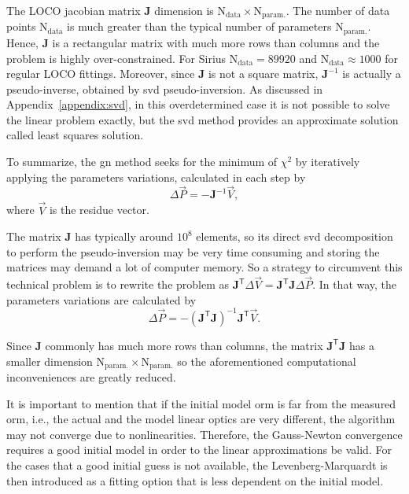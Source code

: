 The LOCO jacobian matrix $\mathbf{J}$ dimension is $\mathrm{N}_{\mathrm{data}} \times \mathrm{N}_{\mathrm{param.}}$. The number of data points $\mathrm{N}_{\mathrm{data}}$ is much greater than the typical number of parameters $\mathrm{N}_{\mathrm{param.}}$. Hence, $\mathbf{J}$ is a rectangular matrix with much more rows than columns and the problem is highly over-constrained. For Sirius $\mathrm{N}_{\mathrm{data}} = 89920$ and $\mathrm{N}_{\mathrm{data}} \approx 1000$ for regular LOCO fittings. Moreover, since $\mathbf{J}$ is not a square matrix, $\mathbf{J}^{-1}$ is actually a pseudo-inverse, obtained by \gls{svd} pseudo-inversion. As discussed in Appendix~\ref{appendix:svd}, in this overdetermined case it is not possible to solve the linear problem exactly, but the \gls{svd} method provides an approximate solution called least squares solution.

To summarize, the \gls{gn} method seeks for the minimum of $\chi^2$ by iteratively applying the parameters variations, calculated in each step by
\begin{equation}
    \Delta \vec{P} = - \mathbf{J}^{-1} \vec{V},
\end{equation}
where $\vec{V}$ is the residue vector.

The matrix $\mathbf{J}$ has typically around $10^{8}$ elements, so its direct \gls{svd} decomposition to perform the pseudo-inversion may be very time consuming and storing the matrices may demand a lot of computer memory. So a strategy to 
circumvent this technical problem is to rewrite the problem as $\mathbf{J}^{\mathsf{T}}\Delta \vec{V} = \mathbf{J}^{\mathsf{T}}\mathbf{J}\Delta \vec{P}$. In that way, the parameters variations are calculated by
\begin{equation}
    \Delta \vec{P} = - \left(\mathbf{J}^{\mathsf{T}} \mathbf{J}\right)^{-1}\mathbf{J}^{\mathsf{T}} \vec{V}.
\end{equation}

Since $\mathbf{J}$ commonly has much more rows than columns, the matrix $\mathbf{J}^{\mathsf{T}} \mathbf{J}$ has a smaller dimension $\mathrm{N}_{\mathrm{param.}} \times \mathrm{N}_{\mathrm{param.}}$ so the aforementioned computational inconveniences are greatly reduced.

It is important to mention that if the initial model \gls{orm} is far from the measured \gls{orm}, i.e., the actual and the model linear optics are very different, the algorithm may not converge due to nonlinearities. Therefore, the Gauss-Newton convergence requires a good initial model in order to the linear approximations be valid. For the cases that a good initial guess is not available, the Levenberg-Marquardt is then introduced as a fitting option that is less dependent on the initial model.
